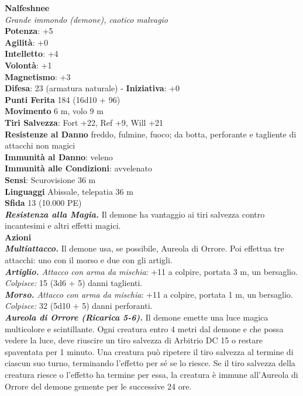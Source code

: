 \begin{multicols}{2}
\medskip\textbf{Nalfeshnee}\\
\emph{Grande immondo (demone), caotico malvagio}\\
\textbf{Potenza}: +5\\
\textbf{Agilità}: +0\\
\textbf{Intelletto}: +4\\
\textbf{Volontà}: +1\\
\textbf{Magnetismo}: +3\\
\textbf{Difesa}: 23 (armatura naturale) - \textbf{Iniziativa}: +0\\
\textbf{Punti Ferita} 184 (16d10 + 96)\\
\textbf{Movimento} 6 m, volo 9 m\\
\textbf{Tiri Salvezza}: Fort +22, Ref +9, Will +21\\
\textbf{Resistenze al Danno} freddo, fulmine, fuoco; da botta, perforante e tagliente di attacchi non magici\\
\textbf{Immunità al Danno}: veleno\\
\textbf{Immunità alle Condizioni}: avvelenato\\
\textbf{Sensi}: Scurovisione 36 m\\
\textbf{Linguaggi} Abissale, telepatia 36 m \\
\textbf{Sfida} 13 (10.000 PE)\smallskip\\
\emph{\textbf{Resistenza alla Magia.}} Il demone ha vantaggio ai tiri salvezza contro incantesimi e altri effetti magici.\\
\smallskip\textbf{Azioni}\\
\emph{\textbf{Multiattacco.}} Il demone usa, se possibile, Aureola di Orrore. Poi effettua tre attacchi: uno con il morso e due con gli artigli.\\
\emph{\textbf{Artiglio.} Attacco con arma da mischia}: +11 a colpire, portata 3 m, un bersaglio.\\
\emph{Colpisce:} 15 (3d6 + 5) danni taglienti.\\
\emph{\textbf{Morso.} Attacco con arma da mischia}: +11 a colpire, portata 1 m, un bersaglio.\\
\emph{Colpisce:} 32 (5d10 + 5) danni perforanti.\\
\emph{\textbf{Aureola di Orrore (Ricarica 5-6).}} Il demone emette una luce magica multicolore e scintillante. Ogni creatura entro 4 metri dal demone e che possa vedere la luce, deve riuscire un tiro salvezza di Arbitrio DC 15 o restare spaventata per 1 minuto. Una creatura può ripetere il tiro salvezza al termine di ciascun suo turno, terminando l'effetto per sé se lo riesce. Se il tiro salvezza della creatura riesce o l'effetto ha termine per essa, la creatura è immune all'Aureola di Orrore del demone gemente per le successive 24 ore.\\

\end{multicols}
